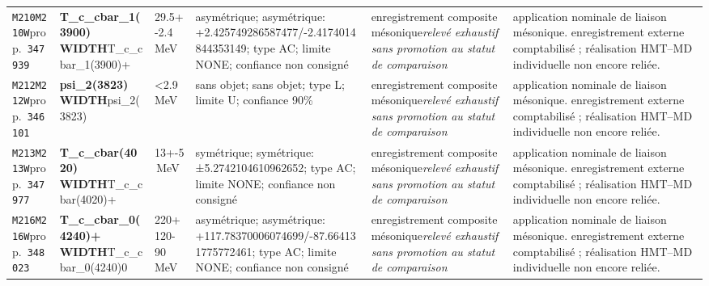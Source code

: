 \begin{landscape}
\begin{longtable}{L{1.85cm}L{4.45cm}L{2.35cm}L{4.05cm}L{3.35cm}L{7.15cm}}
\texttt{M210}\newline \texttt{M210W}\newline prop.\ \texttt{347939} & \textbf{T\_\allowbreak{}c\_\allowbreak{}cbar\_\allowbreak{}1(3900) WIDTH}\newline T\_\allowbreak{}c\_\allowbreak{}cbar\_\allowbreak{}1(3900)+ & 29.5+-2.4\,MeV & asymétrique; asymétrique: +2.425749286587477/-2.4174014844353149; type AC; limite NONE; confiance non consigné & enregistrement composite mésonique\newline \emph{relevé exhaustif sans promotion au statut de comparaison} & application nominale de liaison mésonique. enregistrement externe comptabilisé ; réalisation HMT--MD individuelle non encore reliée. \\
\texttt{M212}\newline \texttt{M212W}\newline prop.\ \texttt{346101} & \textbf{psi\_\allowbreak{}2(3823) WIDTH}\newline psi\_\allowbreak{}2(3823) & \textless{}2.9\,MeV & sans objet; sans objet; type L; limite U; confiance 90\% & enregistrement composite mésonique\newline \emph{relevé exhaustif sans promotion au statut de comparaison} & application nominale de liaison mésonique. enregistrement externe comptabilisé ; réalisation HMT--MD individuelle non encore reliée. \\
\texttt{M213}\newline \texttt{M213W}\newline prop.\ \texttt{347977} & \textbf{T\_\allowbreak{}c\_\allowbreak{}cbar(4020) WIDTH}\newline T\_\allowbreak{}c\_\allowbreak{}cbar(4020)+ & 13+-5\,MeV & symétrique; symétrique: ±5.2742104610962652; type AC; limite NONE; confiance non consigné & enregistrement composite mésonique\newline \emph{relevé exhaustif sans promotion au statut de comparaison} & application nominale de liaison mésonique. enregistrement externe comptabilisé ; réalisation HMT--MD individuelle non encore reliée. \\
\texttt{M216}\newline \texttt{M216W}\newline prop.\ \texttt{348023} & \textbf{T\_\allowbreak{}c\_\allowbreak{}cbar\_\allowbreak{}0(4240)+ WIDTH}\newline T\_\allowbreak{}c\_\allowbreak{}cbar\_\allowbreak{}0(4240)0 & 220+120-90\,MeV & asymétrique; asymétrique: +117.78370006074699/-87.664131775772461; type AC; limite NONE; confiance non consigné & enregistrement composite mésonique\newline \emph{relevé exhaustif sans promotion au statut de comparaison} & application nominale de liaison mésonique. enregistrement externe comptabilisé ; réalisation HMT--MD individuelle non encore reliée. \\

\end{longtable}
\end{landscape}
